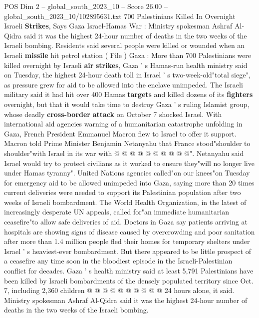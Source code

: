 \begin{textsample}{POS Dim 2 – global\_south\_2023\_10 – Score 26.00 – global\_south\_2023\_10/102895631.txt}  \label{ex:f2_pos_051}
700 Palestinians Killed In Overnight Israeli \textbf{Strikes}, Says Gaza Israel-Hamas War : Ministry spokesman Ashraf Al-Qidra said it was the highest 24-hour number of deaths in the two weeks of the Israeli bombing.
Residents said several people were killed or wounded when an Israeli \textbf{missile} hit petrol station ( File ) Gaza : More than 700 Palestinians were killed overnight by Israeli \textbf{air} \textbf{strikes}, Gaza ' s Hamas-run health ministry said on Tuesday, the highest 24-hour death toll in Israel ' s two-week-old"total siege", as pressure grew for aid to be allowed into the enclave unimpeded.
The Israeli military said it had hit over 400 Hamas \textbf{targets} and killed dozens of its \textbf{fighters} overnight, but that it would take time to destroy Gaza ' s ruling Islamist group, whose deadly \textbf{cross-border} \textbf{attack} on October 7 shocked Israel.
With international aid agencies warning of a humanitarian catastrophe unfolding in Gaza, French President Emmanuel Macron flew to Israel to offer it support.
Macron told Prime Minister Benjamin Netanyahu that France stood"shoulder to shoulder"with Israel in its war with @ @ @ @ @ @ @ @ @ @".
Netanyahu said Israel would try to protect civilians as it worked to ensure they"will no longer live under Hamas tyranny".
United Nations agencies called"on our knees"on Tuesday for emergency aid to be allowed unimpeded into Gaza, saying more than 20 times current deliveries were needed to support its Palestinian population after two weeks of Israeli bombardment.
The World Health Organization, in the latest of increasingly desperate UN appeals, called for"an immediate humanitarian ceasefire"to allow safe deliveries of aid.
Doctors in Gaza say patients arriving at hospitals are showing signs of disease caused by overcrowding and poor sanitation after more than 1.4 million people fled their homes for temporary shelters under Israel ' s heaviest-ever bombardment.
But there appeared to be little prospect of a ceasefire any time soon in the bloodiest episode in the Israeli-Palestinian conflict for decades.
Gaza ' s health ministry said at least 5,791 Palestinians have been killed by Israeli bombardments of the densely populated territory since Oct. 7, including 2,360 children @ @ @ @ @ @ @ @ @ @ 24 hours alone, it said.
Ministry spokesman Ashraf Al-Qidra said it was the highest 24-hour number of deaths in the two weeks of the Israeli bombing.

\end{textsample}
